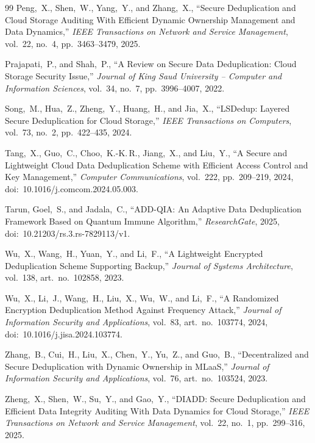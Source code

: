 \documentclass[12pt,a4paper,oneside]{report}
\begin{document}
\begin{thebibliography}{99}
Peng,~X., Shen,~W., Yang,~Y., and Zhang,~X.,
``Secure Deduplication and Cloud Storage Auditing With Efficient Dynamic Ownership Management and Data Dynamics,''
\textit{IEEE Transactions on Network and Service Management},
vol.~22, no.~4, pp.~3463--3479, 2025.

Prajapati,~P., and Shah,~P.,
``A Review on Secure Data Deduplication: Cloud Storage Security Issue,''
\textit{Journal of King Saud University -- Computer and Information Sciences},
vol.~34, no.~7, pp.~3996--4007, 2022.

Song,~M., Hua,~Z., Zheng,~Y., Huang,~H., and Jia,~X.,
``LSDedup: Layered Secure Deduplication for Cloud Storage,''
\textit{IEEE Transactions on Computers}, vol.~73, no.~2, pp.~422--435, 2024.

Tang,~X., Guo,~C., Choo,~K.\mbox{-}K.\,R., Jiang,~X., and Liu,~Y.,
``A Secure and Lightweight Cloud Data Deduplication Scheme with Efficient Access Control and Key Management,''
\textit{Computer Communications}, vol.~222, pp.~209--219, 2024,
doi:~10.1016/j.comcom.2024.05.003.

Tarun, Goel,~S., and Jadala,~C.,
``ADD-QIA: An Adaptive Data Deduplication Framework Based on Quantum Immune Algorithm,''
\textit{ResearchGate}, 2025, doi:~10.21203/rs.3.rs-7829113/v1.

Wu,~X., Wang,~H., Yuan,~Y., and Li,~F.,
``A Lightweight Encrypted Deduplication Scheme Supporting Backup,''
\textit{Journal of Systems Architecture}, vol.~138, art.~no.~102858, 2023.

Wu,~X., Li,~J., Wang,~H., Liu,~X., Wu,~W., and Li,~F.,
``A Randomized Encryption Deduplication Method Against Frequency Attack,''
\textit{Journal of Information Security and Applications},
vol.~83, art.~no.~103774, 2024, doi:~10.1016/j.jisa.2024.103774.

Zhang,~B., Cui,~H., Liu,~X., Chen,~Y., Yu,~Z., and Guo,~B.,
``Decentralized and Secure Deduplication with Dynamic Ownership in MLaaS,''
\textit{Journal of Information Security and Applications},
vol.~76, art.~no.~103524, 2023.

Zheng,~X., Shen,~W., Su,~Y., and Gao,~Y.,
``DIADD: Secure Deduplication and Efficient Data Integrity Auditing With Data Dynamics for Cloud Storage,''
\textit{IEEE Transactions on Network and Service Management},
vol.~22, no.~1, pp.~299--316, 2025.

\end{thebibliography}
\end{document}
